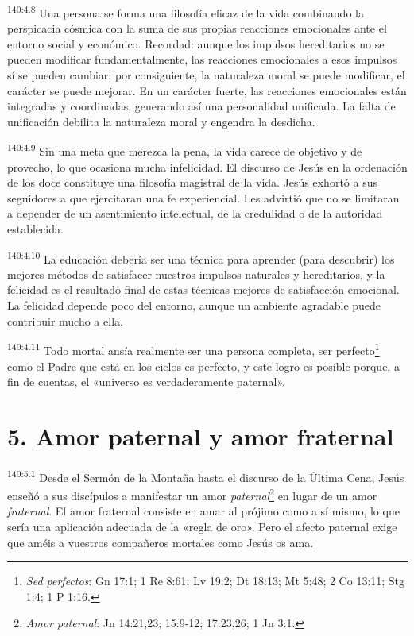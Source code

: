 \par
\textsuperscript{140:4.8} Una persona se forma una filosofía eficaz de la vida combinando la perspicacia cósmica con la suma de sus propias reacciones emocionales ante el entorno social y económico. Recordad: aunque los impulsos hereditarios no se pueden modificar fundamentalmente, las reacciones emocionales a esos impulsos sí se pueden cambiar; por consiguiente, la naturaleza moral se puede modificar, el carácter se puede mejorar. En un carácter fuerte, las reacciones emocionales están integradas y coordinadas, generando así una personalidad unificada. La falta de unificación debilita la naturaleza moral y engendra la desdicha.

\par
\textsuperscript{140:4.9} Sin una meta que merezca la pena, la vida carece de objetivo y de provecho, lo que ocasiona mucha infelicidad. El discurso de Jesús en la ordenación de los doce constituye una filosofía magistral de la vida. Jesús exhortó a sus seguidores a que ejercitaran una fe experiencial. Les advirtió que no se limitaran a depender de un asentimiento intelectual, de la credulidad o de la autoridad establecida.

\par
\textsuperscript{140:4.10} La educación debería ser una técnica para aprender (para descubrir) los mejores métodos de satisfacer nuestros impulsos naturales y hereditarios, y la felicidad es el resultado final de estas técnicas mejores de satisfacción emocional. La felicidad depende poco del entorno, aunque un ambiente agradable puede contribuir mucho a ella.

\par
\textsuperscript{140:4.11} Todo mortal ansía realmente ser una persona completa, ser perfecto\footnote{\textit{Sed perfectos}: Gn 17:1; 1 Re 8:61; Lv 19:2; Dt 18:13; Mt 5:48; 2 Co 13:11; Stg 1:4; 1 P 1:16.} como el Padre que está en los cielos es perfecto, y este logro es posible porque, a fin de cuentas, el «universo es verdaderamente paternal».

\section*{5. Amor paternal y amor fraternal}
\par
\textsuperscript{140:5.1} Desde el Sermón de la Montaña hasta el discurso de la Última Cena, Jesús enseñó a sus discípulos a manifestar un amor \textit{paternal}\footnote{\textit{Amor paternal}: Jn 14:21,23; 15:9-12; 17:23,26; 1 Jn 3:1.} en lugar de un amor \textit{fraternal}. El amor fraternal consiste en amar al prójimo como a sí mismo, lo que sería una aplicación adecuada de la «regla de oro». Pero el afecto paternal exige que améis a vuestros compañeros mortales como Jesús os ama.

